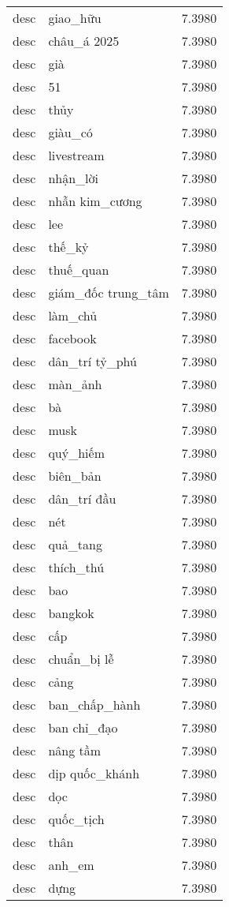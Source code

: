 \documentclass{article}
\begin{document}
\begin{tabular}{lll}
desc & giao\_hữu & 7.3980\\
desc & châu\_á 2025 & 7.3980\\
desc & già & 7.3980\\
desc & 51 & 7.3980\\
desc & thủy & 7.3980\\
desc & giàu\_có & 7.3980\\
desc & livestream & 7.3980\\
desc & nhận\_lời & 7.3980\\
desc & nhẫn kim\_cương & 7.3980\\
desc & lee & 7.3980\\
desc & thế\_kỷ & 7.3980\\
desc & thuế\_quan & 7.3980\\
desc & giám\_đốc trung\_tâm & 7.3980\\
desc & làm\_chủ & 7.3980\\
desc & facebook & 7.3980\\
desc & dân\_trí tỷ\_phú & 7.3980\\
desc & màn\_ảnh & 7.3980\\
desc & bà & 7.3980\\
desc & musk & 7.3980\\
desc & quý\_hiếm & 7.3980\\
desc & biên\_bản & 7.3980\\
desc & dân\_trí đầu & 7.3980\\
desc & nét & 7.3980\\
desc & quả\_tang & 7.3980\\
desc & thích\_thú & 7.3980\\
desc & bao & 7.3980\\
desc & bangkok & 7.3980\\
desc & cấp & 7.3980\\
desc & chuẩn\_bị lễ & 7.3980\\
desc & cảng & 7.3980\\
desc & ban\_chấp\_hành & 7.3980\\
desc & ban chỉ\_đạo & 7.3980\\
desc & nâng tầm & 7.3980\\
desc & dịp quốc\_khánh & 7.3980\\
desc & dọc & 7.3980\\
desc & quốc\_tịch & 7.3980\\
desc & thân & 7.3980\\
desc & anh\_em & 7.3980\\
desc & dựng & 7.3980\\

\end{tabular}
\end{document}
